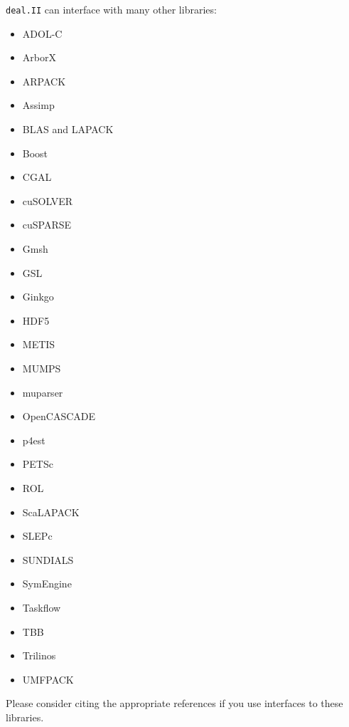 \documentclass{ansarticle-preprint}
\newcommand{\specialword}[1]{\texttt{#1}}
\newcommand{\dealii}{{\specialword{deal.II}}\xspace}
\begin{document}
\dealii can interface with many other libraries:
\begin{multicols}{3}
  \begin{itemize}[leftmargin=4mm]
    \item ADOL-C \cite{griewank1996adolc}
    \item ArborX \cite{lebrun2020arborx}
    \item ARPACK \cite{lehoucq1998arpack}
    \item Assimp \cite{schulze2021assimp}
    \item BLAS and LAPACK \cite{anderson1999lapack}
    \item Boost \cite{boost-web-page}
    \item CGAL \cite{cgal-user-ref}
    \item cuSOLVER \cite{cusolver-web-page}
    \item cuSPARSE \cite{cusparse-web-page}
    \item Gmsh \cite{geuzaine2009gmsh}
    \item GSL \cite{galassi2009gsl,gsl-web-page}
    \item Ginkgo \cite{anzt2020ginkgo,anzt2022ginkgo}
    \item HDF5 \cite{hdf5-web-page}
    \item METIS \cite{karypis1998metis}
    \item MUMPS \cite{amestoy2001mumps,amestoy2019mumps}
    \item muparser \cite{muparser-web-page}
    \item OpenCASCADE \cite{opencascade-web-page}
    \item p4est \cite{burstedde2011p4est}
    \item PETSc \cite{petsc-user-ref,petsc-web-page}
    \item ROL \cite{ridzal2014rol}
    \item ScaLAPACK \cite{blackford1997scalapack}
    \item SLEPc \cite{hernandez2005slepc}
    \item SUNDIALS \cite{hindmarsh2005sundials}
    \item SymEngine \cite{symengine-web-page}
    \item Taskflow \cite{huang2021taskflow}
    \item TBB \cite{reinders2007tbb}
    \item Trilinos \cite{heroux2005trilinos,trilinos-web-page}
    \item UMFPACK \cite{davis2004umfpack}
  \end{itemize}
\end{multicols}
Please consider citing the appropriate references if you use
interfaces to these libraries.
\end{document}
